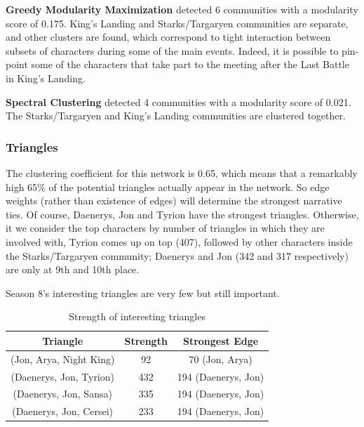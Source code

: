 \documentclass[10pt,twocolumn,letterpaper]{article}
\begin{document}
\textbf{Greedy Modularity Maximization} detected 6 communities with a modularity score of 0.175. King's Landing and Starks/Targaryen communities are separate, and other clusters are found, which correspond to tight interaction between subsets of characters during some of the main events. Indeed, it is possible to pin-point some of the characters that take part to the meeting after the Last Battle in King's Landing.

\textbf{Spectral Clustering} detected 4 communities with a modularity score of 0.021. The Starks/Targaryen and King's Landing communities are clustered together. 

\subsubsection{Triangles}

The clustering coefficient for this network is 0.65, which means that a remarkably high 65\% of the potential triangles actually appear in the network. So edge weights (rather than existence of edges) will determine the strongest narrative ties. Of course, Daenerys, Jon and Tyrion have the strongest triangles.
Otherwise, it we consider the top characters by number of triangles in which they are involved with, Tyrion comes up on top (407), followed by other characters inside the Starks/Targaryen community; Daenerys and Jon (342 and 317 respectively) are only at 9th and 10th place.

Season 8's interesting triangles are very few but still important.

\begin{table}[h!]
    \centering
    \small
    \begin{tabular}{c|c|c}
        Triangle & Strength & Strongest Edge  \\
        \hline
        (Jon, Arya, Night King) & 92 & 70 (Jon, Arya) \\
        (Daenerys, Jon, Tyrion) & 432 & 194 (Daenerys, Jon) \\
        (Daenerys, Jon, Sansa) & 335 & 194 (Daenerys, Jon) \\
        (Daenerys, Jon, Cersei) & 233 & 194 (Daenerys, Jon) \\
        \hline 
    \end{tabular} \\
    \vspace{0.2cm}
    \caption{Strength of interesting triangles}
    \label{tab:my_label}
\end{table}
\end{document}
